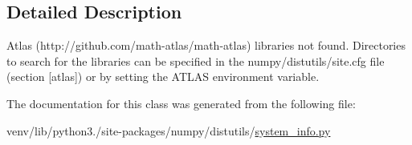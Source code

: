 \subsection{Detailed Description}
\begin{DoxyVerb}Atlas (http://github.com/math-atlas/math-atlas) libraries not found.
Directories to search for the libraries can be specified in the
numpy/distutils/site.cfg file (section [atlas]) or by setting
the ATLAS environment variable.\end{DoxyVerb}
 

The documentation for this class was generated from the following file\+:\begin{DoxyCompactItemize}
\item 
venv/lib/python3./site-\/packages/numpy/distutils/\hyperlink{system__info_8py}{system\+\_\+info.\+py}\end{DoxyCompactItemize}
